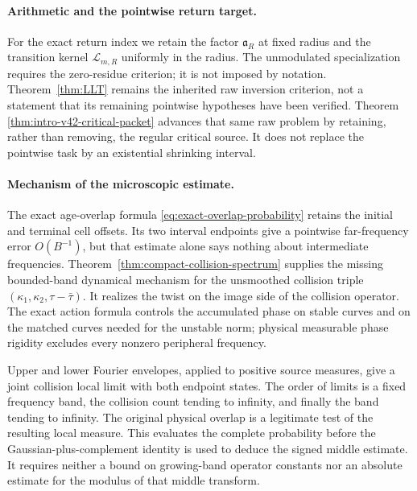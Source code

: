 \documentclass[11pt,reqno]{amsart}
\numberwithin{equation}{section}
\theoremstyle{definition}\newtheorem{definition}[theorem]{Definition}
\theoremstyle{remark}\newtheorem{remark}[theorem]{Remark}
\begin{document}
\paragraph{Arithmetic and the pointwise return target.}
For the exact return index we retain the factor $\mathfrak a_R$ at
fixed radius and the transition kernel $\mathcal L_{m,R}$ uniformly
in the radius. The unmodulated specialization requires the zero-residue
criterion; it is not imposed by notation. Theorem~\ref{thm:LLT}
remains the inherited raw inversion criterion, not a statement that
its remaining pointwise hypotheses have been verified. Theorem~
\ref{thm:intro-v42-critical-packet} advances that same raw problem by
retaining, rather than removing, the regular critical source. It does
not replace the pointwise task by an existential shrinking interval.

\paragraph{Mechanism of the microscopic estimate.}
The exact age-overlap formula
\eqref{eq:exact-overlap-probability} retains the initial and terminal
cell offsets. Its two interval endpoints give a pointwise far-frequency
error $O(B^{-1})$, but that estimate alone says nothing about intermediate
frequencies. Theorem~\ref{thm:compact-collision-spectrum} supplies the
missing bounded-band dynamical mechanism for the unsmoothed collision
triple $(\kappa_1,\kappa_2,\tau-\bar\tau)$. It realizes the twist on
the image side of the collision operator. The exact action formula
controls the accumulated phase on stable curves and on the matched
curves needed for the unstable norm; physical measurable phase rigidity
excludes every nonzero peripheral frequency.

Upper and lower Fourier envelopes, applied to positive source measures,
give a joint collision local limit with both endpoint states. The order of limits is a fixed
frequency band, the collision count tending to infinity, and finally
the band tending to infinity. The original physical overlap is a
legitimate test of the resulting local measure. This evaluates the
complete probability before the Gaussian-plus-complement identity is
used to deduce the signed middle estimate. It requires neither a bound
on growing-band operator constants nor an absolute estimate for the
modulus of that middle transform.
\end{document}

